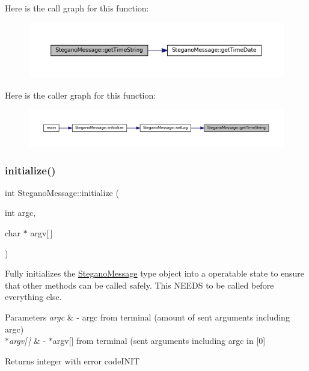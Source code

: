 Here is the call graph for this function\+:
\nopagebreak
\begin{figure}[H]
\begin{center}
\leavevmode
\includegraphics[width=350pt]{classSteganoMessage_a9771a4abc2d7a5a2a8cfb1684f7f313f_cgraph}
\end{center}
\end{figure}
Here is the caller graph for this function\+:
\nopagebreak
\begin{figure}[H]
\begin{center}
\leavevmode
\includegraphics[width=350pt]{classSteganoMessage_a9771a4abc2d7a5a2a8cfb1684f7f313f_icgraph}
\end{center}
\end{figure}
\mbox{\label{classSteganoMessage_aeb4d2b69498c148508e2ca70194679cc}} 
\subsubsection{\texorpdfstring{initialize()}{initialize()}}
{\footnotesize\ttfamily int Stegano\+Message\+::initialize (\begin{DoxyParamCaption}\item[{int}]{argc,  }\item[{char $\ast$}]{argv\mbox{[}$\,$\mbox{]} }\end{DoxyParamCaption})}



Fully initializes the \mbox{\hyperlink{classSteganoMessage}{Stegano\+Message}} type object into a operatable state to ensure that other methods can be called safely. This N\+E\+E\+DS to be called before everything else. 


\begin{DoxyParams}{Parameters}
{\em argc} & -\/ argc from terminal (amount of sent arguments including argc) \\
\hline
{\em $\ast$argv\mbox{[}$\,$\mbox{]}} & -\/ $\ast$argv\mbox{[}\mbox{]} from terminal (sent arguments including argc in \mbox{[}0\mbox{]} \\
\hline
\end{DoxyParams}
\begin{DoxyReturn}{Returns}
integer with error code\+I\+N\+IT 
\end{DoxyReturn}


